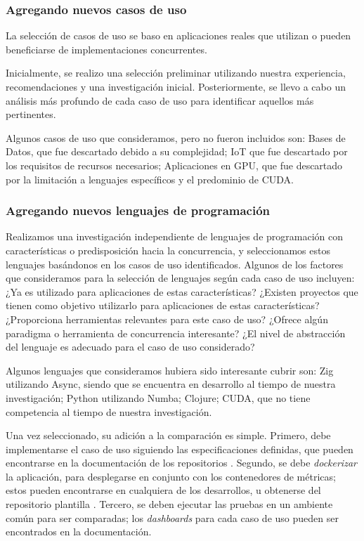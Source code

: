 \documentclass[11pt]{article}
\let\Oldsubsubsection\subsubsection
\renewcommand{\subsubsection}{\FloatBarrier\Oldsubsubsection}
\newcommand{\english}[1]{\textit{#1}}
\begin{document}
\subsubsection{Agregando nuevos casos de uso}

La selección de casos de uso se baso en aplicaciones reales que utilizan o pueden beneficiarse de implementaciones concurrentes.

Inicialmente, se realizo una selección preliminar utilizando nuestra experiencia, recomendaciones y una investigación inicial. Posteriormente, se llevo a cabo un análisis más profundo de cada caso de uso para identificar aquellos más pertinentes.

Algunos casos de uso que consideramos, pero no fueron incluidos son:
Bases de Datos, que fue descartado debido a su complejidad;
IoT que fue descartado por los requisitos de recursos necesarios;
Aplicaciones en GPU, que fue descartado por la limitación a lenguajes específicos y el predominio de CUDA.

\subsubsection{Agregando nuevos lenguajes de programación}

Realizamos una investigación independiente de lenguajes de programación con características o predisposición hacia la concurrencia, y seleccionamos estos lenguajes basándonos en los casos de uso identificados. Algunos de los factores que consideramos para la selección de lenguajes según cada caso de uso incluyen:
¿Ya es utilizado para aplicaciones de estas características?
¿Existen proyectos que tienen como objetivo utilizarlo para aplicaciones de estas características?
¿Proporciona herramientas relevantes para este caso de uso?
¿Ofrece algún paradigma o herramienta de concurrencia interesante?
¿El nivel de abstracción del lenguaje es adecuado para el caso de uso considerado?

Algunos lenguajes que consideramos hubiera sido interesante cubrir son:
Zig utilizando Async, siendo que se encuentra en desarrollo al tiempo de nuestra investigación;
Python utilizando Numba;
Clojure;
CUDA, que no tiene competencia al tiempo de nuestra investigación.

Una vez seleccionado, su adición a la comparación es simple. Primero, debe implementarse el caso de uso siguiendo las especificaciones definidas, que pueden encontrarse en la documentación de los repositorios \cite{repos:docs}. Segundo, se debe \textit{dockerizar} la aplicación, para desplegarse en conjunto con los contenedores de métricas; estos pueden encontrarse en cualquiera de los desarrollos, u obtenerse del repositorio plantilla \cite{repos:template}. Tercero, se deben ejecutar las pruebas en un ambiente común para ser comparadas; los \english{dashboards} para cada caso de uso pueden ser encontrados en la documentación.
\end{document}
